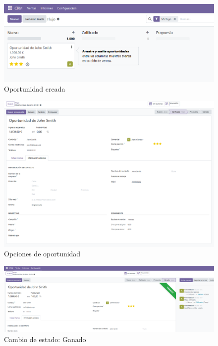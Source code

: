 \documentclass[a4paper,12pt]{article}
\begin{document}
\begin{figure}[h!]
    \centering
    \includegraphics[width=1\textwidth]{pr2odoo68-oportunidadCreada.png}
    \caption{Oportunidad creada}
\end{figure}
\FloatBarrier

\begin{figure}[h!]
    \centering
    \includegraphics[width=1\textwidth]{pr2odoo69-oportunidadOpciones.png}
    \caption{Opciones de oportunidad}
\end{figure}
\FloatBarrier

\begin{figure}[h!]
    \centering
    \includegraphics[width=1\textwidth]{pr2odoo70-oportunidadGanado.png}
    \caption{Cambio de estado: Ganado}
\end{figure}
\FloatBarrier
\end{document}
